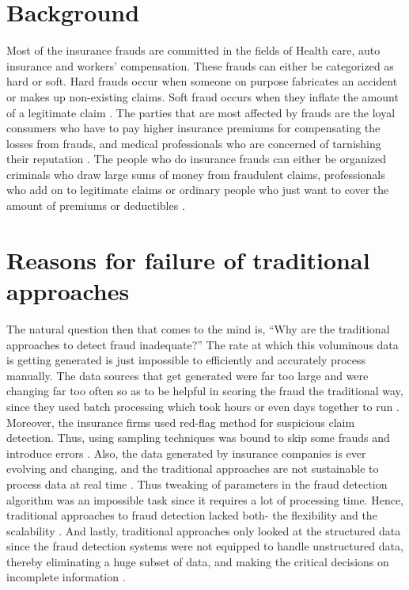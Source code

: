 \documentclass[sigconf]{acmart}
\begin{document}
\section{Background}
Most of the insurance frauds are committed in the fields of Health care, auto insurance and workers' compensation. These frauds can either be categorized as hard or soft. Hard frauds occur when someone on purpose fabricates an accident or makes up non-existing claims. Soft fraud occurs when they inflate the amount of a legitimate claim \cite{link6}. The parties that are most affected by frauds are the loyal consumers who have to pay higher insurance premiums for compensating the losses from frauds, and medical professionals who are concerned of tarnishing their reputation \cite{link1}. The people who do insurance frauds can either be organized criminals who draw large sums of money from fraudulent claims, professionals who add on to legitimate claims or ordinary people who just want to cover the amount of premiums or deductibles \cite{link6}.


\section{Reasons for failure of traditional approaches}
The natural question then that comes to the mind is, ``Why are the traditional approaches to detect fraud inadequate?'' The rate at which this voluminous data is getting generated is just impossible to efficiently and accurately process manually. The data sources that get generated were far too large and were changing far too often so as to be helpful in scoring the fraud the traditional way, since they used batch processing which took hours or even days together to run \cite{link5}. Moreover, the insurance firms used red-flag method for suspicious claim detection. Thus, using sampling techniques was bound to skip some frauds and introduce errors \cite{link3}. Also, the data generated by insurance companies is ever evolving and changing, and the traditional approaches are not sustainable to process data at real time \cite{link7}. Thus tweaking of parameters in the fraud detection algorithm was an impossible task since it requires a lot of processing time. Hence, traditional approaches to fraud detection lacked both- the flexibility and the scalability \cite{link3}. And lastly, traditional approaches only looked at the structured data since the fraud detection systems were not equipped to handle unstructured data, thereby eliminating a huge subset of data, and making the critical decisions on incomplete information \cite{link8}.
\end{document}
